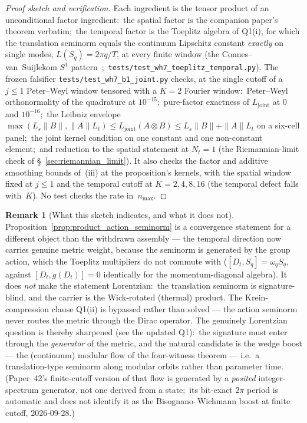 \documentclass[11pt,a4paper]{article}
\theoremstyle{plain}
\theoremstyle{definition}
\newtheorem{remark}[theorem]{Remark}
\newcommand{\nmax}{n_{\max}}
\newcommand{\Nt}{N_{t}}
\newcommand{\Sone}{S^{1}}
\begin{document}
\begin{proof}[Proof sketch and verification]
Each ingredient is the tensor product of an unconditional factor
ingredient:\ the spatial factor is the companion paper's theorem
verbatim;\ the temporal factor is the Toeplitz algebra of
Q1(i), for which the translation seminorm equals the continuum
Lipschitz constant \emph{exactly} on single modes,
$L(S_{q}) = 2\pi q / T$, at every finite window (the
Connes--van~Suijlekom $\Sone$ pattern~\cite{connes_vs2021};\ \texttt{tests/test\_wh7\_toeplitz\_temporal.py}). The frozen falsifier
\texttt{tests/test\_wh7\_b1\_joint.py} checks, at the single cutoff of a
$j \le 1$ Peter--Weyl window tensored with a $K = 2$ Fourier window:\
Peter--Weyl orthonormality of the quadrature at $10^{-15}$;\
pure-factor exactness of $L_{\mathrm{joint}}$ at $0$ and $10^{-16}$;\
the Leibniz envelope
$\max(L_{s}\|B\|, \|A\| L_{t}) \le L_{\mathrm{joint}}(A \otimes B) \le
L_{s}\|B\| + \|A\| L_{t}$ on a six-cell panel;\ the joint kernel
condition on one constant and one non-constant element;\ and
reduction to the spatial statement at $\Nt = 1$ (the
Riemannian-limit check of \S~\ref{sec:riemannian_limit}). It also
checks the factor and additive smoothing bounds of~(iii) at the
proposition's kernels, with the spatial window fixed at $j \le 1$ and
the temporal cutoff at $K = 2, 4, 8, 16$ (the temporal defect falls
with~$K$). No test checks the rate in~$\nmax$.
\end{proof}

\begin{remark}[What this sketch indicates, and what it does not]
\label{rem:not_yet_lorentzian}
Proposition~\ref{prop:product_action_seminorm} is a convergence
statement for a different object than the withdrawn assembly — the temporal
direction now carries genuine metric weight, because the seminorm is
generated by the group action, which the Toeplitz multipliers do not
commute with ($[D_{t}, S_{q}] = \omega_{q} S_{q}$, against
$[D_{t}, g(D_{t})] = 0$ identically for the momentum-diagonal
algebra). It does \emph{not} make the statement Lorentzian:\ the
translation seminorm is signature-blind, and the carrier is the
Wick-rotated (thermal) product. The Krein-compression clause Q1(ii)
is bypassed rather than solved — the action seminorm never routes the
metric through the Dirac operator. The genuinely Lorentzian question
is thereby sharpened (see the updated Q1):\ the signature must enter
through the \emph{generator} of the metric, and the natural candidate
is the wedge boost --- the (continuum) modular flow of the four-witness
theorem --- i.e.\ a translation-type seminorm along modular orbits rather than
parameter time.  (Paper~42's finite-cutoff version of that flow is
generated by a \emph{posited} integer-spectrum generator, not one
derived from a state;\ its bit-exact $2\pi$ period is automatic and
does not identify it as the Bisognano--Wichmann boost at finite
cutoff, 2026-09-28.)
\end{remark}
\end{document}
